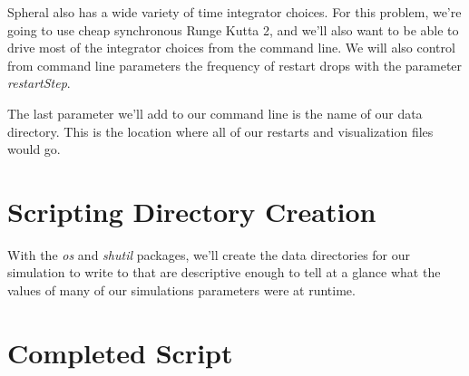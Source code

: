 \documentclass[11pt]{memoir}
\begin{document}


Spheral also has a wide variety of time integrator choices. For this problem, we're going to use cheap synchronous Runge Kutta 2, and we'll also want to be able to drive most of the integrator choices from the command line. We will also control from command line parameters the frequency of restart drops with the parameter \textit{restartStep}.



The last parameter we'll add to our command line is the name of our data directory. This is the location where all of our restarts and visualization files would go.



\section{Scripting Directory Creation}

With the \textit{os} and \textit{shutil} packages, we'll create the data directories for our simulation to write to that are descriptive enough to tell at a glance what the values of many of our simulations parameters were at runtime.



\section{Completed Script}


\end{document}
